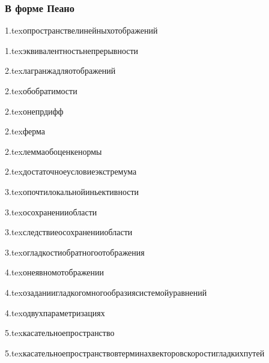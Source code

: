 \subsubsection{В форме Пеано}

{1.tex}{опространствелинейныхотображений}

{1.tex}{эквивалентностьнепрерывности}

{2.tex}{лагранжадляотображений}

{2.tex}{обобратимости}

{2.tex}{онепрдифф}

{2.tex}{ферма}

{2.tex}{леммаобоценкенормы}

{2.tex}{достаточноеусловиеэкстремума}

{3.tex}{опочтилокальнойиньективности}

{3.tex}{осохраненииобласти}

{3.tex}{следствиеосохраненииобласти}

{3.tex}{огладкостиобратногоотображения}

{4.tex}{онеявномотображении}

{4.tex}{озаданиигладкогомногообразиясистемойуравнений}

{4.tex}{одвухпараметризациях}

{5.tex}{касательноепространство}

{5.tex}{касательноепространствовтерминахвекторовскоростигладкихпутей}

